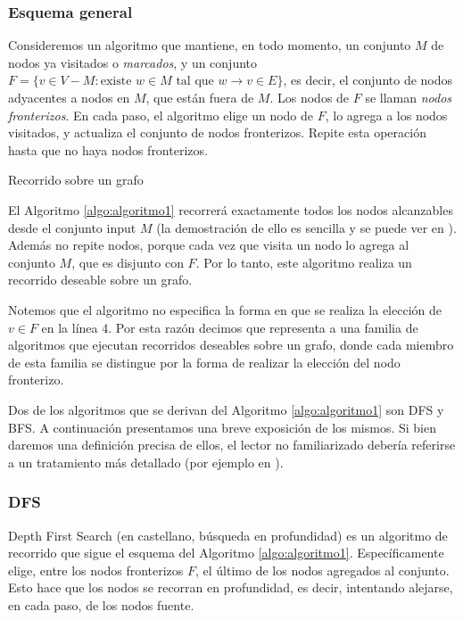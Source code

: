 \subsubsection{Esquema general}
\label{subsubsec:esquema}
Consideremos un algoritmo que mantiene, en todo momento, un conjunto $M$ de nodos ya visitados o \textit{marcados}, y un conjunto $F = \{v \in V - M : \text{existe }w\in M\text{ tal que }w \to v \in E\}$, es decir, el conjunto de nodos adyacentes a nodos en $M$, que están fuera de $M$. Los nodos de $F$ se llaman \textit{nodos fronterizos}. En cada paso, el algoritmo elige un nodo de $F$, lo agrega a los nodos visitados, y actualiza el conjunto de nodos fronterizos. Repite esta operación hasta que no haya nodos fronterizos.

\begin{algorithm}
	\dontprintsemicolon
 	\BlankLine
\caption{Recorrido sobre un grafo}
\label{algo:algoritmo1}
\end{algorithm}

El Algoritmo \ref{algo:algoritmo1} recorrerá exactamente todos los nodos alcanzables desde el conjunto input $M$ (la demostración de ello es sencilla y se puede ver en \cite{gross06}). Además no repite nodos, porque cada vez que visita un nodo lo agrega al conjunto $M$, que es disjunto con $F$. Por lo tanto, este algoritmo realiza un recorrido deseable sobre un grafo.

Notemos que el algoritmo no especifica la forma en que se realiza la elección de $v \in F$ en la línea 4. Por esta razón decimos que representa a una familia de algoritmos que ejecutan recorridos deseables sobre un grafo, donde cada miembro de esta familia se distingue por la forma de realizar la elección del nodo fronterizo.

Dos de los algoritmos que se derivan del Algoritmo \ref{algo:algoritmo1} son DFS y BFS. A continuación presentamos una breve exposición de los mismos. Si bien daremos una definición precisa de ellos, el lector no familiarizado debería referirse a un tratamiento más detallado (por ejemplo en \cite{cormen01}).

\subsubsection{DFS}
Depth First Search (en castellano, búsqueda en profundidad) es un algoritmo de recorrido que sigue el esquema del Algoritmo \ref{algo:algoritmo1}. Específicamente elige, entre los nodos fronterizos $F$, el último de los nodos agregados al conjunto. Esto hace que los nodos se recorran en profundidad, es decir, intentando alejarse, en cada paso, de los nodos fuente.

